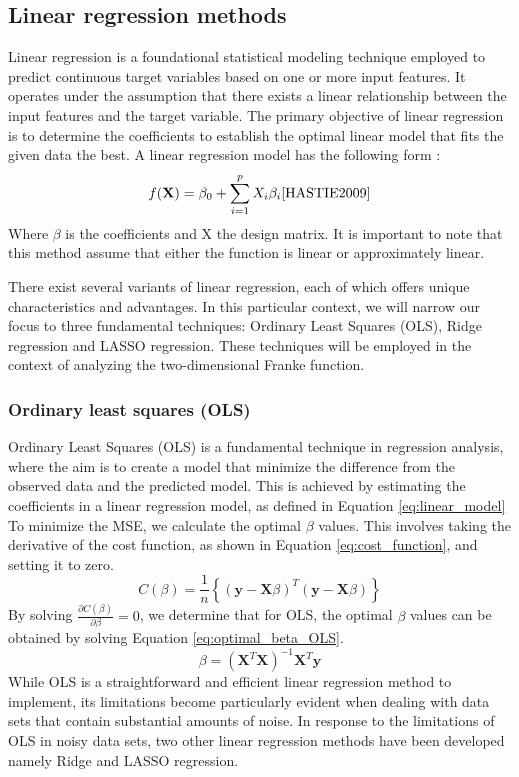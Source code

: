\thispagestyle{plain}
\subsection{Linear regression methods}
\noindent Linear regression is a foundational statistical modeling technique employed to predict continuous target variables based on one or more input features. It operates under the assumption that there exists a linear relationship between the input features and the target variable. The primary objective of linear regression is to determine the coefficients to establish the optimal linear model that fits the given data the best. A linear regression model has the following form :
%
\begin{align}\label{eq:linear_model}
    f(\textbf{X}) = \beta_0 + \sum^{p}_{i=1} X_i \beta_i \text{\cite{HASTIE2009}} %
\end{align}
%
\noindent Where $\beta$ is the coefficients and X the design matrix. It is important to note that this method assume that either the function is linear or approximately linear.

\noindent There exist several variants of linear regression, each of which offers unique characteristics and advantages. In this particular context, we will narrow our focus to three fundamental techniques: Ordinary Least Squares (OLS), Ridge regression and LASSO regression. These techniques will be employed in the context of analyzing the two-dimensional Franke function.

\subsubsection{Ordinary least squares (OLS)}
\noindent Ordinary Least Squares (OLS) is a fundamental technique in regression analysis, where the aim is to create a model that minimize the difference from the observed data and the predicted model. This is achieved by estimating the coefficients in a linear regression model, as defined in Equation \eqref{eq:linear_model} %
To minimize the MSE, we calculate the optimal $\beta$ values. This involves taking the derivative of the cost function, as shown in Equation \eqref{eq:cost_function}, and setting it to zero.
%
\begin{equation}\label{eq:cost_function}
C(\beta) = \frac{1}{n} \left\lbrace ( \textbf{y} - \textbf{X}\beta )^T (\textbf{y} - \textbf{X}\beta)\right\rbrace 
\end{equation}
%
\noindent By solving $\frac{\partial C(\beta)}{\partial \beta} = 0$, we determine that for OLS, the optimal $\beta$ values can be obtained by solving Equation \eqref{eq:optimal_beta_OLS}.
%
\begin{equation}\label{eq:optimal_beta_OLS}
\beta = (\textbf{X}^T \textbf{X})^{-1}\textbf{X}^T \textbf{y} 
\end{equation}
%
\noindent While OLS is a straightforward and efficient linear regression method 
to implement, its limitations become particularly evident when dealing 
with data sets that contain substantial amounts of noise. In response to the limitations of OLS in noisy data sets, two other linear regression methods have been developed namely Ridge and LASSO regression. 

